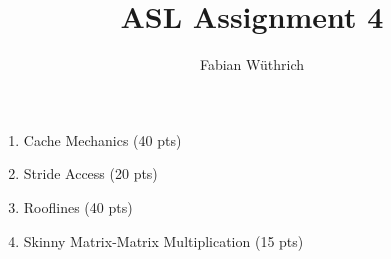 \documentclass[a4paper]{article}
\title{ASL Assignment 4}
\author{Fabian Wüthrich}
\begin{document}
\maketitle

\begin{enumerate}
    \item Cache Mechanics (40 pts)
    
    \item Stride Access (20 pts)
  
    \item Rooflines (40 pts)

    \item Skinny Matrix-Matrix Multiplication (15 pts)
\end{enumerate}
\end{document}
